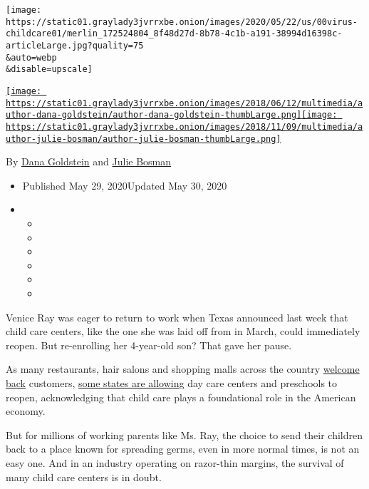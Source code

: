 \texttt{[image: https://static01.graylady3jvrrxbe.onion/images/2020/05/22/us/00virus-childcare01/merlin\_172524804\_8f48d27d-8b78-4c1b-a191-38994d16398c-articleLarge.jpg?quality=75\\\&auto=webp\\\&disable=upscale]}

\href{https://www.nytimes3xbfgragh.onion/by/dana-goldstein}{\texttt{[image: https://static01.graylady3jvrrxbe.onion/images/2018/06/12/multimedia/author-dana-goldstein/author-dana-goldstein-thumbLarge.png]}}\href{https://www.nytimes3xbfgragh.onion/by/julie-bosman}{\texttt{[image: https://static01.graylady3jvrrxbe.onion/images/2018/11/09/multimedia/author-julie-bosman/author-julie-bosman-thumbLarge.png]}}

By \href{https://www.nytimes3xbfgragh.onion/by/dana-goldstein}{Dana
Goldstein} and
\href{https://www.nytimes3xbfgragh.onion/by/julie-bosman}{Julie Bosman}

\begin{itemize}
\item
  Published May 29, 2020Updated May 30, 2020
\item
  \begin{itemize}
  \item
  \item
  \item
  \item
  \item
  \item
  \end{itemize}
\end{itemize}

Venice Ray was eager to return to work when Texas announced last week
that child care centers, like the one she was laid off from in March,
could immediately reopen. But re-enrolling her 4-year-old son? That gave
her pause.

As many restaurants, hair salons and shopping malls across the country
\href{https://www.nytimes3xbfgragh.onion/interactive/2020/us/states-reopen-map-coronavirus.html}{welcome
back} customers,
\href{http://www.hunt-institute.org/covid-19-resources/}{some states are
allowing} day care centers and preschools to reopen, acknowledging that
child care plays a foundational role in the American economy.

But for millions of working parents like Ms. Ray, the choice to send
their children back to a place known for spreading germs, even in more
normal times, is not an easy one. And in an industry operating on
razor-thin margins, the survival of many child care centers is in doubt.

